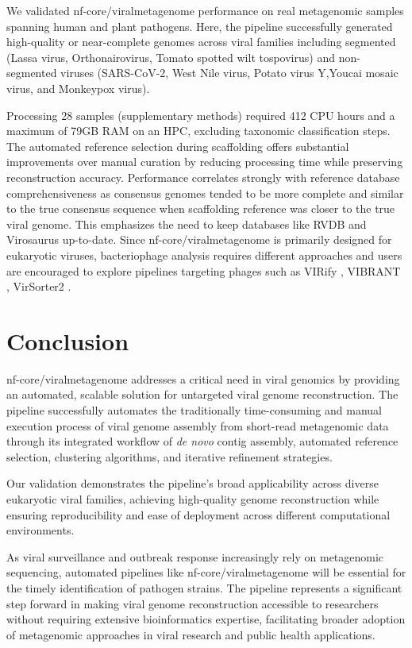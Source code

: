 We validated nf-core/viralmetagenome performance on real metagenomic samples spanning human and plant pathogens. Here, the pipeline successfully generated high-quality or near-complete genomes across viral families including segmented (Lassa virus, Orthonairovirus, Tomato spotted wilt tospovirus) and non-segmented viruses (SARS-CoV-2, West Nile virus, Potato virus Y,Youcai mosaic virus, and Monkeypox virus).

Processing 28 samples (supplementary methods) required 412 CPU hours and a maximum of 79GB RAM on an HPC, excluding taxonomic classification steps. The automated reference selection during scaffolding offers substantial improvements over manual curation by reducing processing time while preserving reconstruction accuracy. Performance correlates strongly with reference database comprehensiveness as consensus genomes tended to be more complete and similar to the true consensus sequence when scaffolding reference was closer to the true viral genome. This emphasizes the need to keep databases like RVDB \cite{Goodacre2018-dw} and Virosaurus \cite{Gleizes2020-rq} up-to-date. Since nf-core/viralmetagenome is primarily designed for eukaryotic viruses, bacteriophage analysis requires different approaches and users are encouraged to explore pipelines targeting phages such as VIRify \cite{Rangel-Pineros2022-wv}, VIBRANT \cite{Kieft2020-aq}, VirSorter2 \cite{Guo2021-rf}.


\section{Conclusion}

nf-core/viralmetagenome addresses a critical need in viral genomics by providing an automated, scalable solution for untargeted viral genome reconstruction. The pipeline successfully automates the traditionally time-consuming and manual execution process of viral genome assembly from short-read metagenomic data through its integrated workflow of \textit{de novo} contig assembly, automated reference selection, clustering algorithms, and iterative refinement strategies.

Our validation demonstrates the pipeline's broad applicability across diverse eukaryotic viral families, achieving high-quality genome reconstruction while ensuring reproducibility and ease of deployment across different computational environments.

As viral surveillance and outbreak response increasingly rely on metagenomic sequencing, automated pipelines like nf-core/viralmetagenome will be essential for the timely identification of pathogen strains. The pipeline represents a significant step forward in making viral genome reconstruction accessible to researchers without requiring extensive bioinformatics expertise, facilitating broader adoption of metagenomic approaches in viral research and public health applications.


